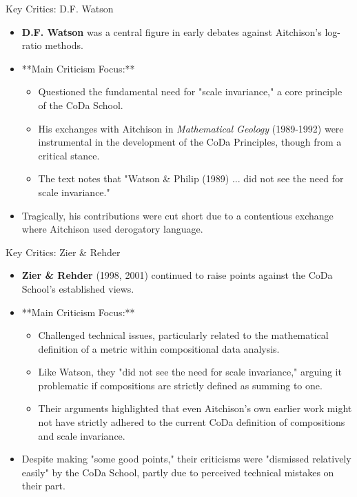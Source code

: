 \begin{frame}{Key Critics: D.F. Watson}
\scriptsize   %

    \begin{itemize}
        \item \textbf{D.F. Watson} was a central figure in early debates against Aitchison's log-ratio methods.
        \item **Main Criticism Focus:**
        \begin{itemize}
            \item Questioned the fundamental need for "scale invariance," a core principle of the CoDa School.
            \item His exchanges with Aitchison in \textit{Mathematical Geology} (1989-1992) were instrumental in the development of the CoDa Principles, though from a critical stance.
            \item The text notes that "Watson \& Philip (1989) ... did not see the need for scale invariance."
        \end{itemize}
        \item Tragically, his contributions were cut short due to a contentious exchange where Aitchison used derogatory language.
    \end{itemize}
\end{frame}
\begin{frame}{Key Critics: Zier \& Rehder}
\scriptsize   %

    \begin{itemize}
        \item \textbf{Zier \& Rehder} (1998, 2001) continued to raise points against the CoDa School's established views.
        \item **Main Criticism Focus:**
        \begin{itemize}
            \item Challenged technical issues, particularly related to the mathematical definition of a metric within compositional data analysis.
            \item Like Watson, they "did not see the need for scale invariance," arguing it problematic if compositions are strictly defined as summing to one.
            \item Their arguments highlighted that even Aitchison's own earlier work might not have strictly adhered to the current CoDa definition of compositions and scale invariance.
        \end{itemize}
        \item Despite making "some good points," their criticisms were "dismissed relatively easily" by the CoDa School, partly due to perceived technical mistakes on their part.
    \end{itemize}
\end{frame}
